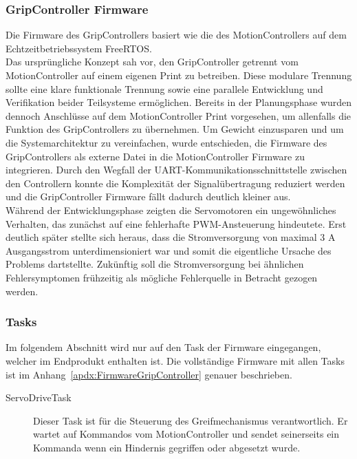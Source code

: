 \documentclass[main.tex]{subfiles} %
\begin{document}

\subsubsection{GripController Firmware}

Die Firmware des GripControllers basiert wie die des MotionControllers auf dem Echtzeitbetriebssystem FreeRTOS.\\
Das ursprüngliche Konzept sah vor, den GripController getrennt vom MotionController auf einem
eigenen Print zu betreiben. Diese modulare Trennung sollte eine klare funktionale Trennung
sowie eine parallele Entwicklung und Verifikation beider Teilsysteme ermöglichen. Bereits in der Planungsphase
wurden dennoch Anschlüsse auf dem MotionController Print vorgesehen, um allenfalls die Funktion des
GripControllers zu übernehmen. Um Gewicht einzusparen und um die Systemarchitektur zu vereinfachen,
wurde entschieden, die Firmware des GripControllers als externe Datei in die MotionController Firmware
zu integrieren. Durch den Wegfall der UART-Kommunikationsschnittstelle zwischen den Controllern
konnte die Komplexität der Signalübertragung reduziert werden und die GripController Firmware fällt dadurch
deutlich kleiner aus.\\

Während der Entwicklungsphase zeigten die Servomotoren ein ungewöhnliches Verhalten, das zunächst auf eine
fehlerhafte PWM-Ansteuerung hindeutete. Erst deutlich später stellte sich heraus, dass die Stromversorgung von
maximal 3 A Ausgangsstrom unterdimensioniert war und somit die eigentliche Ursache des Problems dartstellte.
Zukünftig soll die Stromversorgung bei ähnlichen Fehlersymptomen frühzeitig als mögliche Fehlerquelle in Betracht
gezogen werden.\\

\subsubsection*{Tasks}
Im folgendem Abschnitt wird nur auf den Task der Firmware eingegangen, welcher im Endprodukt enthalten ist.
Die vollständige Firmware mit allen Tasks ist im Anhang~\ref{apdx:FirmwareGripController} genauer beschrieben.

\begin{description}
    \item[ServoDriveTask] Dieser Task ist für die Steuerung des Greifmechanismus verantwortlich. Er wartet auf
    Kommandos vom MotionController und sendet seinerseits ein Kommanda wenn ein Hindernis gegriffen oder abgesetzt
    wurde.
\end{description}
\end{document}
